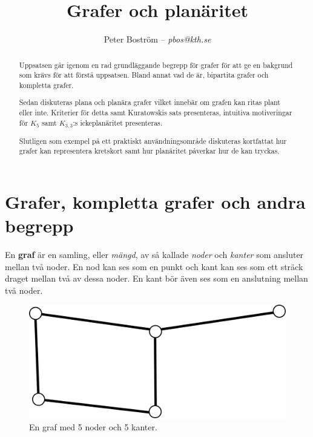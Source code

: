 \documentclass[a4paper,11pt]{article}
\title{Grafer och planäritet}
\author{Peter Boström -- \emph{pbos@kth.se}}
\begin{document}
\maketitle
\pagestyle{fancyplain}

\begin{abstract}
Uppsatsen går igenom en rad grundläggande begrepp för grafer för att ge en bakgrund som krävs för att förstå uppsatsen. Bland annat vad de är, bipartita grafer och kompletta grafer.

Sedan diskuteras plana och planära grafer vilket innebär om grafen kan ritas plant eller inte. Kriterier för detta samt Kuratowskis sats presenteras, intuitiva motiveringar för $K_5$ samt $K_{3,3}$:s ickeplanäritet presenteras.

Slutligen som exempel på ett praktiskt användningsområde diskuteras kortfattat hur grafer kan representera kretskort samt hur planäritet påverkar hur de kan tryckas.

\end{abstract}
\clearpage

\section*{Grafer, kompletta grafer och andra begrepp}

En \textbf{graf} är en samling, eller \emph{mängd}, av så kallade \emph{noder} och \emph{kanter} som ansluter mellan två noder. En nod kan ses som en punkt och kant kan ses som ett sträck draget mellan två av dessa noder. En kant bör även ses som en anslutning mellan två noder.

\begin{figure}[!ht]
	\begin{center}
		\includegraphics{fig1}
		\caption{En graf med 5 noder och 5 kanter.}
		\label{fig1}
	\end{center}
\end{figure}
\FloatBarrier
\end{document}
